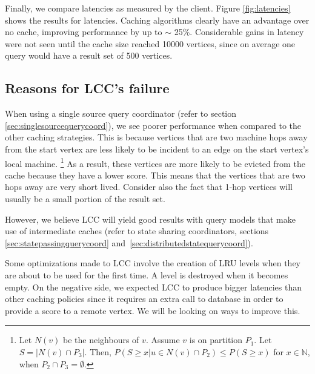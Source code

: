 Finally, we compare latencies as measured by the client. Figure \ref{fig:latencies}
shows the results for latencies. Caching algorithms clearly have an advantage
over no cache, improving performance by up to $\sim$ 25\%. Considerable gains in
latency were not seen until the cache size reached 10000 vertices, since on
average one query would have a result set of 500 vertices.

\subsection{Reasons for LCC's failure}
\label{sec:lccfailure}
When using a single source query coordinator (refer to section
\ref{sec:singlesourcequerycoord}), we see poorer performance when compared to
the other caching strategies. This is because vertices that are two machine hops
away from the start vertex are less likely to be incident to an edge on the
start vertex's local machine.
\footnote{
	Let $N(v)$ be the neighbours of $v$. Assume $v$ is on partition $P_1$. Let
	$S = |N(v) \cap P_3|$. Then, $P(S \geq x | u \in N(v) \cap P_2) \leq P(S \geq
	x)$ for $x \in \mathbb{N}$, when $P_2 \cap P_3 = \emptyset$.
}
As a result, these vertices are more likely to be
evicted from the cache because they have a lower score. This means that the
vertices that are two hops away are very short lived. Consider also the fact
that 1-hop vertices will usually be a small portion of the result set.

However, we believe LCC will yield good results with query models that
make use of intermediate caches (refer to state sharing coordinators,
sections \ref{sec:statepassingquerycoord} and~\ref{sec:distributedstatequerycoord}).

Some optimizations made to LCC involve the creation of LRU levels when they
are about to be used for the first time. A level is destroyed when it becomes
empty. On the negative side, we expected LCC to produce bigger latencies than
other caching policies since it requires an extra call to database in order to
provide a score to a remote vertex. We will be looking on ways to improve this.
